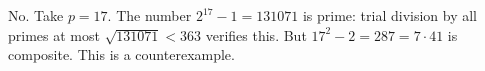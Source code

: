 No. Take $p=17$. The number $2^{17}-1=131071$ is prime: trial division by all primes at most $\sqrt{131071}<363$ verifies this. But $17^2-2=287=7\cdot41$ is composite. This is a counterexample.
